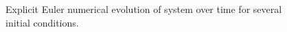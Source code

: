 \documentclass[a4paper, 11pt]{article}
\begin{document}
\begin{figure}[H]
\caption{Explicit Euler numerical evolution of system over time for several initial conditions.}
\end{figure}
\end{document}
